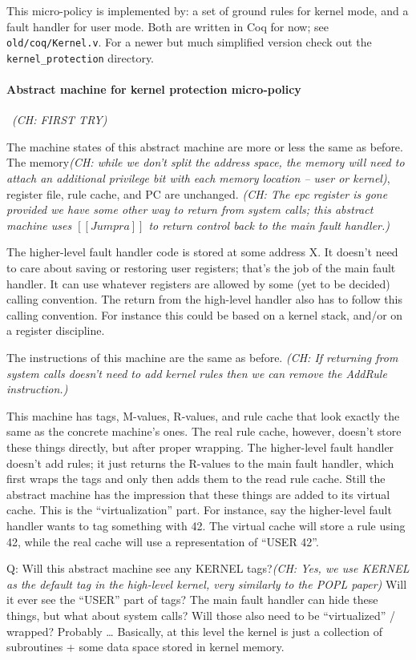 \documentclass{article}
\newcommand{\ch}[1]{{\color{dkblue}\em (CH: #1)}}
\begin{document}
This micro-policy is implemented by: a set of ground rules for kernel
mode, and a fault handler for user mode. Both are written in Coq for
now; see {\tt old/coq/Kernel.v}. For a newer but much simplified
version check out the {\tt kernel\_protection} directory.

\paragraph{Abstract machine for kernel protection micro-policy}
~\ch{FIRST TRY}

The machine states of this abstract machine are more or less the same
as before. The memory\ch{while we don't split the address space, the
  memory will need to attach an additional privilege bit with each
  memory location -- user or kernel}, register file, rule cache, and
PC are unchanged. \ch{The epc register is gone provided we have some
  other way to return from system calls; this abstract machine uses
  $[[Jump ra]]$ to return control back to the main fault handler.}

The higher-level fault handler code is stored at some address X. It
doesn't need to care about saving or restoring user registers; that's
the job of the main fault handler. It can use whatever registers are
allowed by some (yet to be decided) calling convention. The return
from the high-level handler also has to follow this calling
convention. For instance this could be based on a kernel stack,
and/or on a register discipline.

The instructions of this machine are the same as before. \ch{If
  returning from system calls doesn't need to add kernel rules then we
  can remove the AddRule instruction.}

This machine has tags, M-values, R-values, and rule cache that
look exactly the same as the concrete machine's ones. The real rule
cache, however, doesn't store these things directly, but after proper
wrapping. The higher-level fault handler doesn't add rules; it just
returns the R-values to the main fault handler, which first wraps the
tags and only then adds them to the read rule cache. Still the
abstract machine has the impression that these things are added to its
virtual cache. This is the ``virtualization'' part. For instance, say
the higher-level fault handler wants to tag something with 42. The
virtual cache will store a rule using 42, while the real cache will
use a representation of ``USER 42''.

Q: Will this abstract machine see any KERNEL tags?\ch{Yes, we use
  KERNEL as the default tag in the high-level kernel, very similarly
  to the POPL paper} Will it ever see the ``USER'' part of tags? The
main fault handler can hide these things, but what about system calls?
Will those also need to be ``virtualized'' / wrapped? Probably \ldots
%
Basically, at this level the kernel is just a collection of
subroutines + some data space stored in kernel memory.
\end{document}
